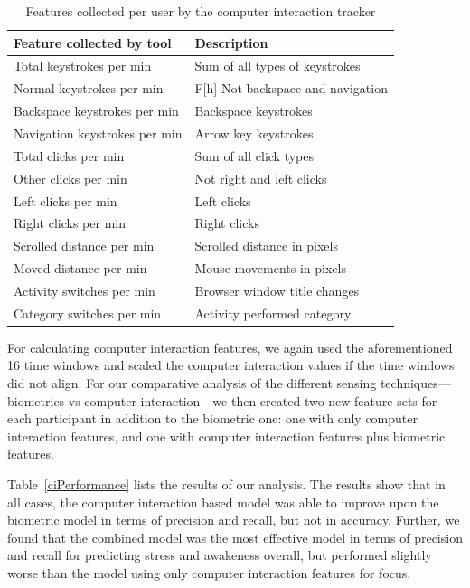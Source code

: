 \begin{table}
\begin{center}
\begin{tabular}{l l}
\hline

Feature collected by tool & Description \\ 
\hline
Total keystrokes per min& Sum of all types of keystrokes \\ 
Normal keystrokes per min&F[h] Not backspace and navigation \\ 
Backspace keystrokes per min& Backspace keystrokes \\ 
Navigation keystrokes per min& Arrow key keystrokes \\ 
Total clicks per min& Sum of all click types \\ 
Other clicks per min& Not right and left clicks \\ 
Left clicks per min& Left clicks \\ 
Right clicks per min& Right clicks \\ 
Scrolled distance per min& Scrolled distance in pixels \\ 
Moved distance per min& Mouse movements in pixels \\ 
Activity switches per min& Browser window title changes \\ 
Category switches per min& Activity performed category \\ 
\hline
\end{tabular}
\caption{Features collected per user by the computer interaction tracker}%
\label{tracker}
\end{center}
\vspace*{-4mm}
\end{table}

For calculating computer interaction features, we again used the aforementioned 16 time windows and scaled the computer interaction values if the time windows did not align. For our comparative analysis of the different sensing techniques---biometrics vs computer interaction---we then created two new feature sets for each participant in addition to the biometric one: one with only computer interaction features, and one with computer interaction features plus biometric features. 

Table~\ref{ciPerformance} lists the results of our analysis. The results show that in all cases, the computer interaction based model was able to improve upon the biometric model in terms of precision and recall, but not in accuracy. Further, we found that the combined model was the most effective model in terms of precision and recall for predicting stress and awakeness overall, but performed slightly worse than the model using only computer interaction features for focus. 



